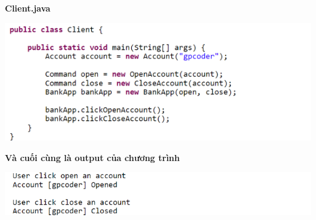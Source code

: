 \textbf{Client.java}
\begin{center}
\includegraphics{GALLEYS/images/chapter7/code6}
\end{center}
\textbf{Và cuối cùng là output của chương trình}
\begin{center}
\includegraphics{GALLEYS/images/chapter7/code7}
\end{center}

